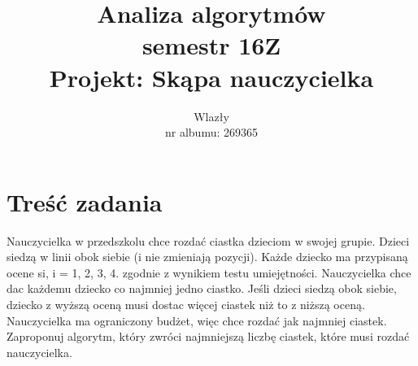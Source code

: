 \documentclass{article}
\title{\vspace{7cm}\LARGE Analiza algorytmów\\semestr 16Z\\Projekt: Skąpa nauczycielka}
\author{\LargeŁukasz Wlazły\\nr albumu: 269365}
\date{}
\begin{document}
	\maketitle
	\newpage

	\section{Treść zadania}

	Nauczycielka w przedszkolu chce rozdać ciastka dzieciom w swojej grupie. Dzieci siedzą w linii obok siebie (i nie zmieniają pozycji). Każde dziecko ma przypisaną ocene si, i = 1, 2, 3, 4. zgodnie z wynikiem testu umiejętności.
	Nauczycielka chce dac każdemu dziecko co najmniej jedno ciastko. Jeśli dzieci siedzą obok siebie, dziecko z wyższą oceną musi dostac więcej ciastek niż to z niższą oceną. Nauczycielka ma ograniczony budżet, więc chce rozdać jak najmniej ciastek. Zaproponuj algorytm, który zwróci najmniejszą liczbę ciastek, które musi rozdać nauczycielka.
\end{document}
